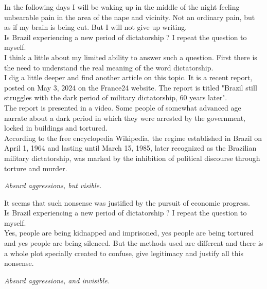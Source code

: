 \documentclass[11pt]{book}
\begin{document}
\noindent In the following days I will be waking up in the middle of the night feeling unbearable pain in the area of the nape and vicinity. Not an ordinary pain, but as if my brain is being cut. But I will not give up writing. \\

\noindent Is Brazil experiencing a new period of dictatorship ? I repeat the question to myself. \\

\noindent I think a little about my limited ability to answer such a question. First there is the need to understand the real meaning of the word dictatorship. \\

\noindent I dig a little deeper and find another article on this topic. It is a recent report, posted on May 3, 2024 on the France24 website. The report is titled "Brazil still struggles with the dark period of military dictatorship, 60 years later". \\

\noindent The report is presented in a video. Some people of somewhat advanced age narrate about a dark period in which they were arrested by the government, locked in buildings and tortured. \\

\noindent According to the free encyclopedia Wikipedia, the regime established in Brazil on April 1, 1964 and lasting until March 15, 1985, later recognized as the Brazilian military dictatorship, was marked by the inhibition of political discourse through torture and murder.

\noindent \begin{center} \emph{Absurd aggressions, but visible.} \end{center}

\noindent It seems that such nonsense was justified by the pursuit of economic progress. \\

\noindent Is Brazil experiencing a new period of dictatorship ? I repeat the question to myself. \\
 
\noindent Yes, people are being kidnapped and imprisoned, yes people are being tortured and yes people are being silenced. But the methods used are different and there is a whole plot specially created to confuse, give legitimacy and justify all this nonsense.

\noindent \begin{center} \emph{Absurd aggressions, and invisible.} \end{center}
\end{document}

